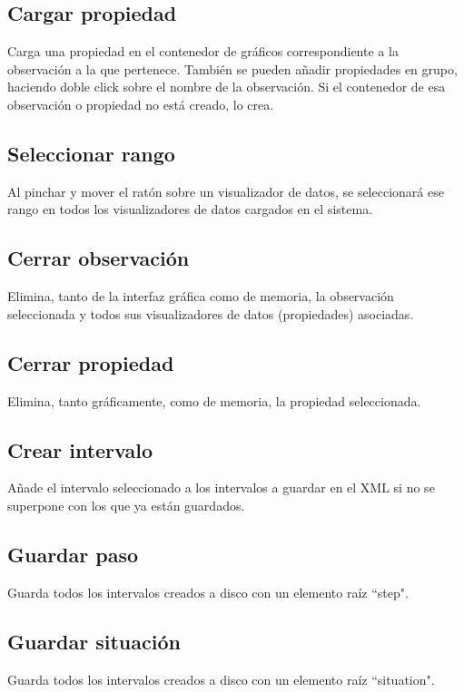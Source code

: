\subsection{Cargar propiedad}
Carga una propiedad en el contenedor de gr\'aficos correspondiente a la observaci\'on a la que pertenece.
Tambi\'en se pueden a\~nadir propiedades en grupo, haciendo doble click sobre el nombre de la observaci\'on.
Si el contenedor de esa observaci\'on o propiedad no est\'a creado, lo crea.

\subsection{Seleccionar rango}
Al pinchar y mover el rat\'on sobre un visualizador de datos, se seleccionar\'a ese rango en todos
los visualizadores de datos cargados en el sistema.

\subsection{Cerrar observaci\'on}
Elimina, tanto de la interfaz gr\'afica como de memoria, la observaci\'on
seleccionada y todos sus visualizadores de datos (propiedades) asociadas.

\subsection{Cerrar propiedad}
Elimina, tanto gr\'aficamente, como de memoria, la propiedad seleccionada.

\subsection{Crear intervalo}
A\~nade el intervalo seleccionado a los intervalos a guardar en el XML si no se superpone con los que
ya est\'an guardados.

\subsection{Guardar paso}
Guarda todos los intervalos creados a disco con un elemento ra\'iz ``step".

\subsection{Guardar situaci\'on}
Guarda todos los intervalos creados a disco con un elemento ra\'iz ``situation".



